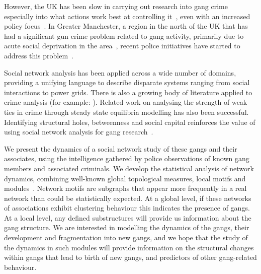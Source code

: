 \documentclass[twocolumn]{svjour3}          %
\theoremstyle{definition}
\begin{document}
However, the UK has been slow in carrying out research into gang crime
especially into what actions work best at controlling
it~\citep{pitts:2007,hallsworth+silverstone:2009}, even with an
increased policy
focus~\citep{HalesLewisSilverstone2006,golding+mcclory:2008}. In
Greater Manchester, a region in the north of the UK that has had a
significant gun crime problem related to gang activity, primarily due
to acute social deprivation in the
area~\citep{BBCNews2003,BBCNews2004,HalesLewisSilverstone2006}, recent
police initiatives have started to address this
problem~\citep{BBCNews2010}.

Social network analysis has been applied across a wide number of
domains, providing a unifying language to describe disparate systems
ranging from social interactions to power grids. There is also a
growing body of literature applied to crime analysis (for example:
\citep{BaronTindall1993,Klerks2001,Hansen2005,OatleyZeleznikowLearyEwart2005,OatleyEwartZeleznikow2006,CalvoArmengolZenou2006,HutchinsBenhamHutchins2009}).
Related work \citep{CalvoArmengolVerdierZenou2007,PatacchiniZenou2008} on analysing
the strength of weak ties in crime through steady state equilibria
modelling has also been successful. Identifying structural holes,
betweenness and social capital reinforces the value of using social
network analysis for gang research~\citep{papachristos:2006}.

We present the dynamics of a social network study of these gangs and
their associates, using the intelligence gathered by police
observations of known gang members and associated criminals. We
develop the statistical analysis of network dynamics, combining
well-known global topological measures, local motifs and
modules~\citep{CostaRodriguesTraviesoVillasBoas2007,Jackson2008,Newman2003}.
Network motifs are subgraphs that appear more frequently in a real
network than could be statistically expected. At a global level, if
these networks of associations exhibit clustering behaviour this
indicates the presence of gangs. At a local level, any defined
substructures will provide us information about the gang structure. We
are interested in modelling the dynamics of the gangs, their
development and fragmentation into new gangs, and we hope that the
study of the dynamics in such modules will provide information on the
structural changes within gangs that lead to birth of new gangs, and
predictors of other gang-related behaviour.
\end{document}

